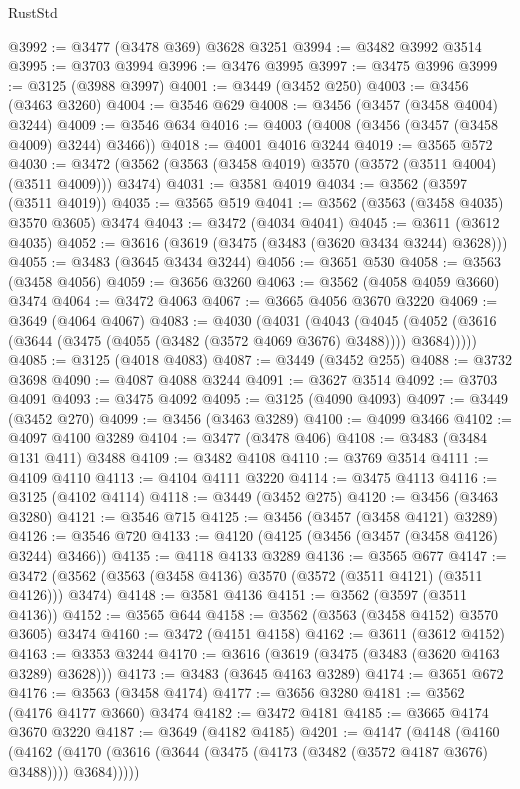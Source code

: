 \begin{lexlean}{RustStd}
\begin{coremodule}
@3992 := @3477 (@3478 @369) @3628 @3251
@3994 := @3482 @3992 @3514
@3995 := @3703 @3994
@3996 := @3476 @3995
@3997 := @3475 @3996
@3999 := @3125 (@3988 @3997)
@4001 := @3449 (@3452 @250)
@4003 := @3456 (@3463 @3260)
@4004 := @3546 @629
@4008 := @3456 (@3457 (@3458 @4004) @3244)
@4009 := @3546 @634
@4016 := @4003 (@4008 (@3456 (@3457 (@3458 @4009) @3244) @3466))
@4018 := @4001 @4016 @3244
@4019 := @3565 @572
@4030 := @3472 (@3562 (@3563 (@3458 @4019) @3570 (@3572 (@3511 @4004) (@3511 @4009))) @3474)
@4031 := @3581 @4019
@4034 := @3562 (@3597 (@3511 @4019))
@4035 := @3565 @519
@4041 := @3562 (@3563 (@3458 @4035) @3570 @3605) @3474
@4043 := @3472 (@4034 @4041)
@4045 := @3611 (@3612 @4035)
@4052 := @3616 (@3619 (@3475 (@3483 (@3620 @3434 @3244) @3628)))
@4055 := @3483 (@3645 @3434 @3244)
@4056 := @3651 @530
@4058 := @3563 (@3458 @4056)
@4059 := @3656 @3260
@4063 := @3562 (@4058 @4059 @3660) @3474
@4064 := @3472 @4063
@4067 := @3665 @4056 @3670 @3220
@4069 := @3649 (@4064 @4067)
@4083 := @4030
    (@4031
      (@4043
        (@4045 (@4052 (@3616 (@3644 (@3475 (@4055 (@3482 (@3572 @4069 @3676) @3488)))) @3684)))))
@4085 := @3125 (@4018 @4083)
@4087 := @3449 (@3452 @255)
@4088 := @3732 @3698
@4090 := @4087 @4088 @3244
@4091 := @3627 @3514
@4092 := @3703 @4091
@4093 := @3475 @4092
@4095 := @3125 (@4090 @4093)
@4097 := @3449 (@3452 @270)
@4099 := @3456 (@3463 @3289)
@4100 := @4099 @3466
@4102 := @4097 @4100 @3289
@4104 := @3477 (@3478 @406)
@4108 := @3483 (@3484 @131 @411) @3488
@4109 := @3482 @4108
@4110 := @3769 @3514
@4111 := @4109 @4110
@4113 := @4104 @4111 @3220
@4114 := @3475 @4113
@4116 := @3125 (@4102 @4114)
@4118 := @3449 (@3452 @275)
@4120 := @3456 (@3463 @3280)
@4121 := @3546 @715
@4125 := @3456 (@3457 (@3458 @4121) @3289)
@4126 := @3546 @720
@4133 := @4120 (@4125 (@3456 (@3457 (@3458 @4126) @3244) @3466))
@4135 := @4118 @4133 @3289
@4136 := @3565 @677
@4147 := @3472 (@3562 (@3563 (@3458 @4136) @3570 (@3572 (@3511 @4121) (@3511 @4126))) @3474)
@4148 := @3581 @4136
@4151 := @3562 (@3597 (@3511 @4136))
@4152 := @3565 @644
@4158 := @3562 (@3563 (@3458 @4152) @3570 @3605) @3474
@4160 := @3472 (@4151 @4158)
@4162 := @3611 (@3612 @4152)
@4163 := @3353 @3244
@4170 := @3616 (@3619 (@3475 (@3483 (@3620 @4163 @3289) @3628)))
@4173 := @3483 (@3645 @4163 @3289)
@4174 := @3651 @672
@4176 := @3563 (@3458 @4174)
@4177 := @3656 @3280
@4181 := @3562 (@4176 @4177 @3660) @3474
@4182 := @3472 @4181
@4185 := @3665 @4174 @3670 @3220
@4187 := @3649 (@4182 @4185)
@4201 := @4147
    (@4148
      (@4160
        (@4162 (@4170 (@3616 (@3644 (@3475 (@4173 (@3482 (@3572 @4187 @3676) @3488)))) @3684)))))

\end{coremodule}
\end{lexlean}
